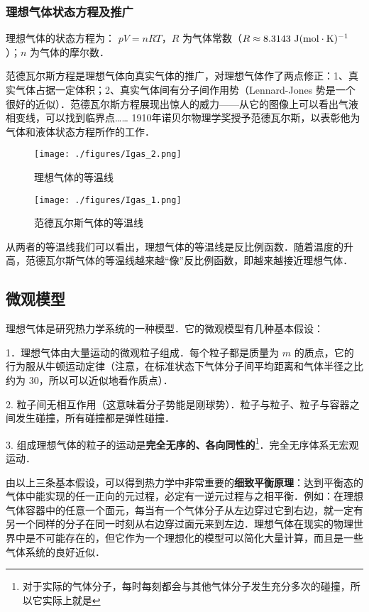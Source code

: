 \subsubsection{理想气体状态方程及推广}
理想气体的状态方程为： $pV=nRT$，$R$ 为气体常数（$R\approx 8.3143\ \rm{J}(\rm{mol\cdot K})^{-1}$）；$n$ 为气体的摩尔数．

范德瓦尔斯方程是理想气体向真实气体的推广，对理想气体作了两点修正：1、真实气体占据一定体积；2、真实气体间有分子间作用势（Lennard-Jones 势是一个很好的近似）．范德瓦尔斯方程展现出惊人的威力——从它的图像上可以看出气液相变线，可以找到临界点…… 1910年诺贝尔物理学奖授予范德瓦尔斯，以表彰他为气体和液体状态方程所作的工作．
\begin{figure}[ht]
\centering
\texttt{[image: ./figures/Igas\_2.png]}
\caption{理想气体的等温线} \label{Igas_fig1}
\end{figure}
\begin{figure}[ht]
\centering
\texttt{[image: ./figures/Igas\_1.png]}
\caption{范德瓦尔斯气体的等温线} \label{Igas_fig2}
\end{figure}

从两者的等温线我们可以看出，理想气体的等温线是反比例函数．随着温度的升高，范德瓦尔斯气体的等温线越来越“像”反比例函数，即越来越接近理想气体．
\subsection{微观模型}

理想气体是研究热力学系统的一种模型．它的微观模型有几种基本假设：

1．理想气体由大量运动的微观粒子组成．每个粒子都是质量为 $m$ 的质点，它的行为服从牛顿运动定律（注意，在标准状态下气体分子间平均距离和气体半径之比约为 $30$，所以可以近似地看作质点）．

2. 粒子间无相互作用（这意味着分子势能是刚球势）．粒子与粒子、粒子与容器之间发生碰撞，所有碰撞都是弹性碰撞．

3. 组成理想气体的粒子的运动是\textbf{完全无序的、各向同性的}\footnote{对于实际的气体分子，每时每刻都会与其他气体分子发生充分多次的碰撞，所以它实际上就是}．完全无序体系无宏观运动．

由以上三条基本假设，可以得到热力学中非常重要的\textbf{细致平衡原理}：达到平衡态的气体中能实现的任一正向的元过程，必定有一逆元过程与之相平衡．例如：在理想气体容器中的任意一个面元，每当有一个气体分子从左边穿过它到右边，就一定有另一个同样的分子在同一时刻从右边穿过面元来到左边．理想气体在现实的物理世界中是不可能存在的，但它作为一个理想化的模型可以简化大量计算，而且是一些气体系统的良好近似．